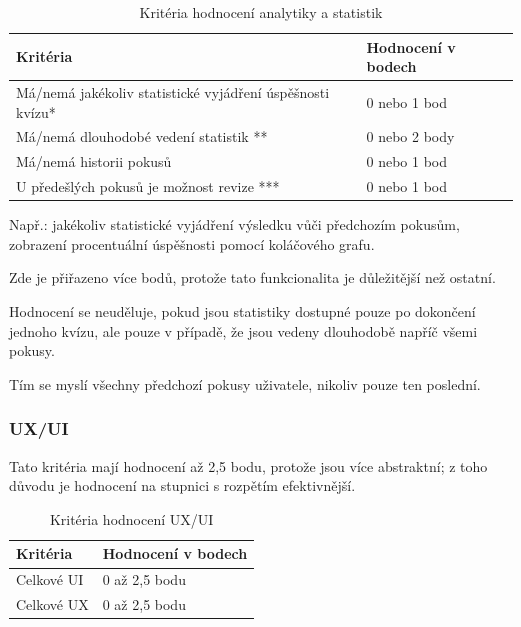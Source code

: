 \documentclass{vskpou} %
\begin{document}
\begin{table}[H]
\caption{Kritéria hodnocení analytiky a statistik}
\label{tab:analytika}
\centering
\begin{threeparttable}
\begin{tabular}{|p{}|l|}
\hline
\textbf{Kritéria} & \textbf{Hodnocení v bodech} \\ \hline
Má/nemá jakékoliv statistické vyjádření úspěšnosti kvízu* & 0 nebo 1 bod \\ \hline
Má/nemá dlouhodobé vedení statistik ** & 0 nebo 2 body \\ \hline
Má/nemá historii pokusů & 0 nebo 1 bod \\ \hline
U předešlých pokusů je možnost revize *** & 0 nebo 1 bod \\ \hline
\end{tabular}
\begin{tablenotes}[flushleft]
\footnotesize
\item[*] Např.: jakékoliv statistické vyjádření výsledku vůči předchozím pokusům, zobrazení procentuální úspěšnosti pomocí koláčového grafu.
\item[**] Zde je přiřazeno více bodů, protože tato funkcionalita je důležitější než ostatní.
\item[**] Hodnocení se neuděluje, pokud jsou statistiky dostupné pouze po dokončení jednoho kvízu, ale pouze v případě, že jsou vedeny dlouhodobě napříč všemi pokusy.
\item[***] Tím se myslí všechny předchozí pokusy uživatele, nikoliv pouze ten poslední.
\end{tablenotes}
\end{threeparttable}
\end{table}

\subsubsection{UX/UI}

Tato kritéria mají hodnocení až 2,5 bodu, protože jsou více abstraktní; z toho důvodu je hodnocení na stupnici s rozpětím efektivnější.

\begin{table}[htbp]
\caption{Kritéria hodnocení UX/UI}
\label{tab:uxui}
\centering
\begin{tabular}{|p{}|l|}
\hline
\textbf{Kritéria} & \textbf{Hodnocení v bodech} \\ \hline
Celkové UI & 0 až 2,5 bodu \\ \hline
Celkové UX & 0 až 2,5 bodu \\ \hline
\end{tabular}
\end{table}
\end{document}
